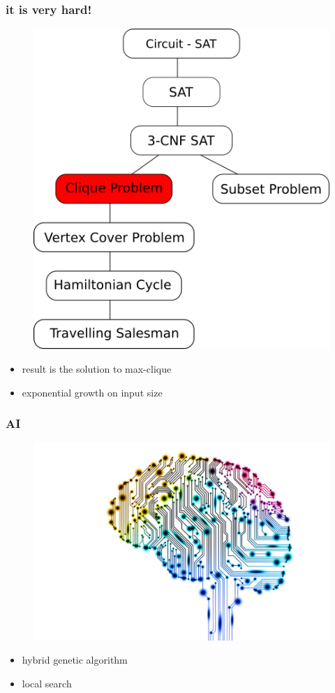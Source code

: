 \documentclass{beamer}
\begin{document}
\begin{frame}
	\frametitle{it is very hard!}

	\begin{figure}
	\centering
	\includegraphics[scale=0.3]{figs/Relative_NPC_chart}
	\end{figure}
	\begin{itemize}
		\item result is the solution to max-clique
		\item exponential growth on input size
	\end{itemize}
	
\end{frame}


\begin{frame}
	\frametitle{AI}
		\begin{figure}
	\includegraphics[scale=0.1]{figs/ai}
	\end{figure}
	\begin{itemize}
		\item hybrid genetic algorithm
		\item local search
	\end{itemize}
	
\end{frame}
\end{document}
